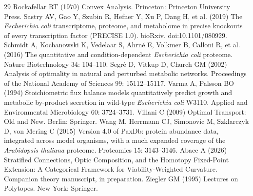 \begin{thebibliography}{29}
Rockafellar RT (1970) Convex Analysis. Princeton: Princeton University Press.
Sastry AV, Gao Y, Szubin R, Hefner Y, Xu P, Dang H, et al. (2019) The \emph{Escherichia coli} transcriptome, proteome, and
             metabolome in precise knockouts of every transcription
             factor (PRECISE 1.0). bioRxiv. doi:10.1101/080929.
Schmidt A, Kochanowski K, Vedelaar S, Ahrn{\'e} E, Volkmer B, Calloni R, et al. (2016) The quantitative and condition-dependent \emph{Escherichia
             coli} proteome. Nature Biotechnology 34: 104--110.
Segr{\`e} D, Vitkup D, Church GM (2002) Analysis of optimality in natural and perturbed metabolic
             networks. Proceedings of the National Academy of Sciences 99: 15112--15117.
Varma A, Palsson BO (1994) Stoichiometric flux balance models quantitatively predict
             growth and metabolic by-product secretion in wild-type
             \emph{Escherichia coli} {W3110}. Applied and Environmental Microbiology 60: 3724--3731.
Villani C (2009) Optimal Transport: Old and New. Berlin: Springer.
Wang M, Herrmann CJ, Simonovic M, Szklarczyk D, von Mering C (2015) Version 4.0 of {PaxDb}: protein abundance data, integrated
             across model organisms, with a much expanded coverage of the
             \emph{Arabidopsis thaliana} proteome. Proteomics 15: 3143--3146.
Abaee A (2026) Stratified Connections, Optic Composition, and the Homotopy
           Fixed-Point Extension: A Categorical Framework for
           Viability-Weighted Curvature. Companion theory manuscript, in preparation.
Ziegler GM (1995) Lectures on Polytopes. New York: Springer.
\end{thebibliography}
